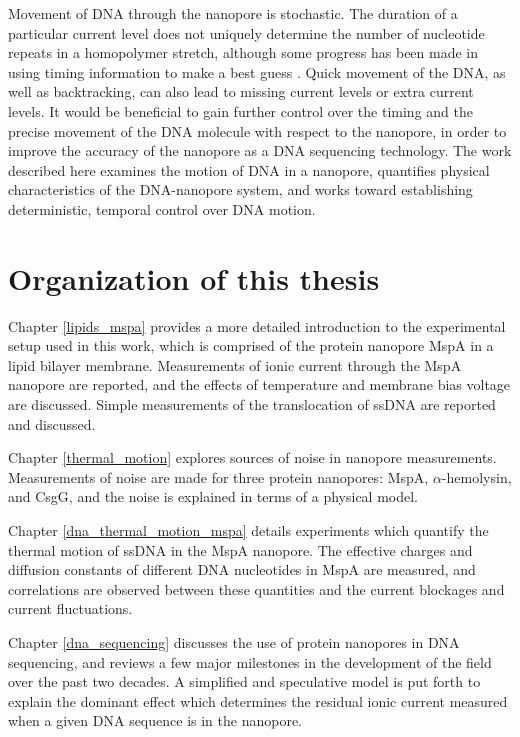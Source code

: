 Movement of DNA through the nanopore is stochastic.  The duration of a particular current level does not uniquely determine the number of nucleotide repeats in a homopolymer stretch, although some progress has been made in using timing information to make a best guess \citep{Sarkozy2017}.  Quick movement of the DNA, as well as backtracking, can also lead to missing current levels or extra current levels.  It would be beneficial to gain further control over the timing and the precise movement of the DNA molecule with respect to the nanopore, in order to improve the accuracy of the nanopore as a DNA sequencing technology.  The work described here examines the motion of DNA in a nanopore, quantifies physical characteristics of the DNA-nanopore system, and works toward establishing deterministic, temporal control over DNA motion.

\section{Organization of this thesis}

Chapter \ref{lipids_mspa} provides a more detailed introduction to the experimental setup used in this work, which is comprised of the protein nanopore MspA in a lipid bilayer membrane.  Measurements of ionic current through the MspA nanopore are reported, and the effects of temperature and membrane bias voltage are discussed.  Simple measurements of the translocation of ssDNA are reported and discussed.

Chapter \ref{thermal_motion} explores sources of noise in nanopore measurements.  Measurements of noise are made for three protein nanopores: MspA, $\alpha$-hemolysin, and CsgG, and the noise is explained in terms of a physical model.

Chapter \ref{dna_thermal_motion_mspa} details experiments which quantify the thermal motion of ssDNA in the MspA nanopore.  The effective charges and diffusion constants of different DNA nucleotides in MspA are measured, and correlations are observed between these quantities and the current blockages and current fluctuations.

Chapter \ref{dna_sequencing} discusses the use of protein nanopores in DNA sequencing, and reviews a few major milestones in the development of the field over the past two decades.  A simplified and speculative model is put forth to explain the dominant effect which determines the residual ionic current measured when a given DNA sequence is in the nanopore.


